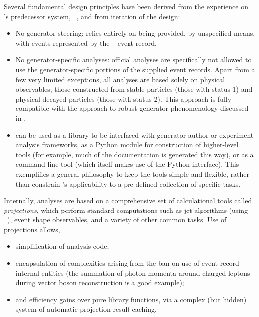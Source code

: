 Several fundamental design principles have been derived from the experience on
\rivet's predecessor system, \hztool~\cite{Bromley:1995np,Waugh:2006ip}, and
from iteration of the \rivet design:
%
\begin{itemize}
\item No generator steering: \rivet relies entirely on being provided, by
  unspecified means, with events represented by the \hepmc~\cite{Dobbs:2001ck}
  event record.
\item No generator-specific analyses: official \rivet analyses are specifically
  not allowed to use the generator-specific portions of the supplied event
  records. Apart from a few very limited exceptions, all analyses are based
  solely on physical observables, \ie those constructed from stable particles
  (those with \hepmc status 1) and physical decayed particles (those with status
  2). This approach is fully compatible with the approach to robust generator
  phenomenology discussed in .
\item \rivet can be used as a \cpp library to be interfaced with generator
  author or experiment analysis frameworks, as a Python module for construction
  of higher-level tools (for example, much of the \rivet documentation is
  generated this way), or as a command line tool (which itself makes use of the
  Python interface). This exemplifies a general philosophy to keep the tools
  simple and flexible, rather than constrain \rivet's applicability to a
  pre-defined collection of specific tasks.
\end{itemize}

Internally, \rivet analyses are based on a comprehensive set of calculational
tools called \emph{projections}, which perform standard computations such as jet
algorithms (using \fastjet~\cite{Cacciari:2006sm}), event shape observables, and
a variety of other common tasks. Use of projections allows, \eg
%
\begin{itemize}
\item simplification of analysis code;
\item encapsulation of complexities arising from the ban on use of event record
  internal entities (the summation of photon momenta around charged leptons
  during vector boson reconstruction is a good example);
\item and efficiency gains over pure library functions, via a complex (but
  hidden) system of automatic projection result caching.
\end{itemize}

